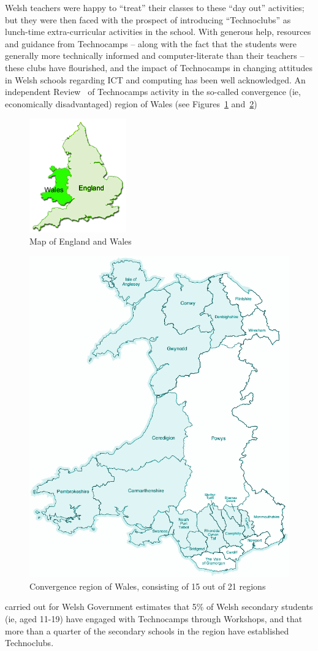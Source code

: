 \documentclass{sig-alternate}
\begin{document}
Welsh teachers were happy to ``treat'' their classes
to these ``day out'' activities; but they were then faced with
the prospect of introducing ``Technoclubs'' as lunch-time
extra-curricular activities in the school.
With generous help, resources and guidance from Technocamps
-- along with the fact that the students were generally
more technically informed and computer-literate than their teachers -- 
these clubs have flourished, and the impact of Technocamps
in changing attitudes in Welsh schools regarding ICT and computing
has been well acknowledged.
An independent Review~\cite{Wavehill:2015}
of Technocamps activity in the so-called convergence
(ie, economically disadvantaged) region of Wales
(see Figures~\ref{fig:UK} and~\ref{fig:wales})
\begin{figure}
  \centering
  \includegraphics[width=0.45\columnwidth]{images/UK.png}
  \caption{Map of England and Wales}
  \label{fig:UK}
\end{figure}
\begin{figure}
  \centering
  \includegraphics[width=0.45\columnwidth]{images/wales.png}
  \caption{Convergence region of Wales, consisting of 15 out of 21 regions}
  \label{fig:wales}
\end{figure}
carried out for Welsh Government estimates that
5\% of Welsh secondary students (ie, aged 11-19)
have engaged with Technocamps through Workshops,
and that more than a quarter of the secondary schools
in the region have established Technoclubs.
\end{document}
